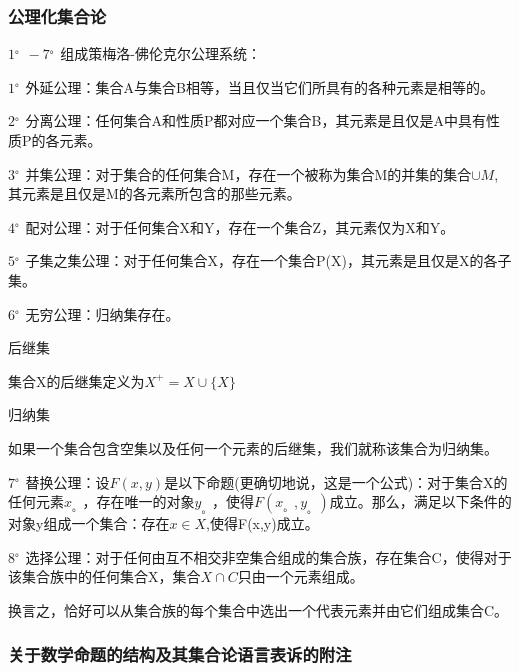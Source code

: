 \documentclass{article}
\begin{document}
	 \subsubsection{公理化集合论}
	 \par $1^{\mbox{。}}-7^{\mbox{。}}$组成策梅洛-佛伦克尔公理系统：
	 \par $1^{\mbox{。}}$外延公理：集合A与集合B相等，当且仅当它们所具有的各种元素是相等的。
	 \par $2^{\mbox{。}}$分离公理：任何集合A和性质P都对应一个集合B，其元素是且仅是A中具有性质P的各元素。
	 \par $3^{\mbox{。}}$并集公理：对于集合的任何集合M，存在一个被称为集合M的并集的集合$\cup M$,其元素是且仅是M的各元素所包含的那些元素。
	 \par $4^{\mbox{。}}$配对公理：对于任何集合X和Y，存在一个集合Z，其元素仅为X和Y。
	 \par $5^{\mbox{。}}$子集之集公理：对于任何集合X，存在一个集合P(X)，其元素是且仅是X的各子集。
	 \par $6^{\mbox{。}}$无穷公理：归纳集存在。
	 \par 后继集
	 \par 集合X的后继集定义为$X^{+}=X\cup \{X\}$
	 \par 归纳集
	 \par 如果一个集合包含空集以及任何一个元素的后继集，我们就称该集合为归纳集。
	 \par $7^{\mbox{。}}$替换公理：设$F(x,y)$是以下命题(更确切地说，这是一个公式)：对于集合X的任何元素$x_{\mbox{。}}$，存在唯一的对象$y_{\mbox{。}}$，使得$F(x_{\mbox{。}},y_{\mbox{。}})$成立。那么，满足以下条件的对象y组成一个集合：存在$x\in X$,使得F(x,y)成立。
	 \par $8^{\mbox{。}}$选择公理：对于任何由互不相交非空集合组成的集合族，存在集合C，使得对于该集合族中的任何集合X，集合$X\cap C$只由一个元素组成。
	 \par 换言之，恰好可以从集合族的每个集合中选出一个代表元素并由它们组成集合C。
	 \subsubsection{关于数学命题的结构及其集合论语言表诉的附注}
	 
	
\end{document}
